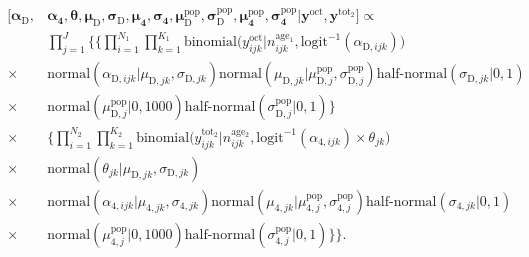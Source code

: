 \documentclass[12pt, oneside, titlepage]{article}   	%
\begin{document}
\begin{align}
  \begin{split}
  [  \bm{\alpha_\mathrm{D}} , &  \bm{\alpha_4}, \bm{\theta}, \bm{\mu_\mathrm{D}} , \bm{\sigma_\mathrm{D}} , \bm{\mu_4} , \bm{\sigma_4} , \bm{\mu^\mathrm{pop}_\mathrm{D}}, \bm{\sigma^\mathrm{pop}_\mathrm{D}} , \bm{\mu^\mathrm{pop}_4}, \bm{\sigma^\mathrm{pop}_4} | \bm{y^\mathrm{oct}} , \bm{y^\mathrm{tot_2}}  ]  \propto  \\  
 	     & \prod_{j=1}^{J} \bigg\{ \Big\{ \prod_{i=1}^{N_1}  \prod_{k=1}^{K_1} \mathrm{binomial} \big( y^{\mathrm{oct}}_{ijk} | n^\mathrm{age_1}_{ijk}, \mathrm{logit}^{-1}( \alpha_{\mathrm{D},ijk} ) \big) \\
	      \times & \mathrm{normal} ( \alpha_{\mathrm{D},ijk}  | \mu_{\mathrm{D},jk}, \sigma{_{\mathrm{D},jk} }) \mathrm{normal} ( \mu_{\mathrm{D},jk}  | \mu^\mathrm{pop}_{\mathrm{D},j}, \sigma^\mathrm{pop}_{\mathrm{D},j} ) 
 \textrm{half-normal} ( \sigma_{\mathrm{D},jk} | 0,1) \\
 \times & \mathrm{normal} ( \mu^\mathrm{pop}_{\mathrm{D},j} | 0 , 1000 ) \textrm{half-normal} ( \sigma^\mathrm{pop}_{\mathrm{D},j} | 0,1)   \Big\}  \\
  \times &  \Big\{ \prod_{i=1}^{N_2}  \prod_{k=1}^{K_2}   \mathrm{binomial} \big( y^{\mathrm{tot_2}}_{ijk} | n^\mathrm{age_2}_{ijk}, \mathrm{logit}^{-1}( \alpha_{\mathrm{4},ijk} ) \times \theta_{jk} \big) \\
   \times & \mathrm{normal} ( \theta_{jk}  | \mu_{\mathrm{D},jk}, \sigma{_{\mathrm{D},jk} }) \\
    \times & \mathrm{normal} ( \alpha_{\mathrm{4},ijk}  | \mu_{\mathrm{4},jk}, \sigma{_{\mathrm{4},jk} }) \mathrm{normal} ( \mu_{\mathrm{4},jk}  | \mu^\mathrm{pop}_{\mathrm{4},j}, \sigma^\mathrm{pop}_{\mathrm{4},j} ) \textrm{half-normal} ( \sigma_{\mathrm{4},jk} | 0,1) \\
    \times & \mathrm{normal} ( \mu^\mathrm{pop}_{\mathrm{4},j} | 0 , 1000 ) \textrm{half-normal} ( \sigma^\mathrm{pop}_{\mathrm{4},j} | 0,1) \Big\}  \bigg\}.
  \end{split}
\end{align}
\end{document}
